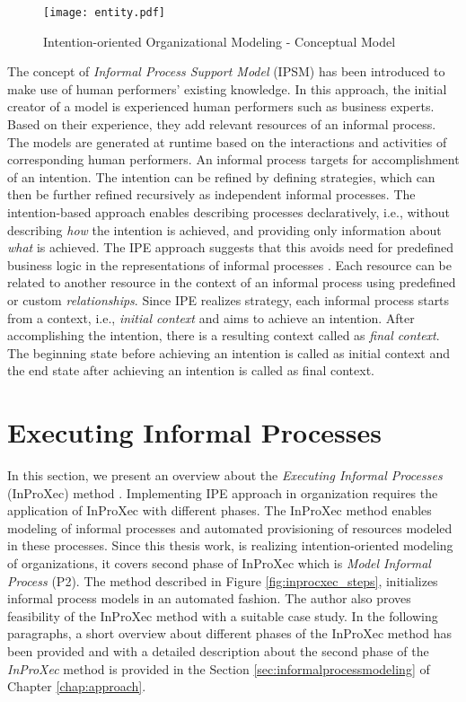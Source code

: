 \begin{figure}
	\centering
	\texttt{[image: entity.pdf]}
	\caption{Intention-oriented Organizational Modeling - Conceptual Model}
	\label{fig:entitymodel}
\end{figure}

The concept of \textit{Informal Process Support Model} (IPSM) \cite{Sungur2014a} has been introduced to make use of human performers' existing knowledge. In this approach, the initial creator of a model is experienced human performers such as business experts. Based on their experience, they add relevant resources of an informal process. The models are generated at runtime based on the interactions and activities of corresponding human performers. An informal process targets for accomplishment of an intention. The intention can be refined by defining strategies, which can then be further refined recursively as independent informal processes. The intention-based approach enables describing processes declaratively, i.e., without describing \textit{how} the intention is achieved, and providing only information about \textit{what} is achieved. The IPE approach suggests that this avoids need for predefined business logic in the representations of informal processes \cite{Sungur2014a}. Each resource can be related to another resource in the context of an informal process using predefined or custom \textit{relationships}. Since IPE realizes strategy, each informal process starts from a context, i.e., \textit{initial context} and aims to achieve an intention. After accomplishing the intention, there is a resulting context called as \textit{final context}. The beginning state before achieving an intention is called as initial context and the end state after achieving an intention is called as final context.

\section{Executing Informal Processes}
\label{sec:inproxec}
In this section, we present an overview about the \textit{Executing Informal Processes} (InProXec) method \cite{Sungur2015}. Implementing IPE approach in organization requires the application of InProXec with different phases. The InProXec method enables modeling of informal processes and automated provisioning of resources modeled in these processes. Since this thesis work, is realizing intention-oriented modeling of organizations, it covers second phase of InProXec which is \textit{Model Informal Process} (P2). The method described in Figure \ref{fig:inprocxec_steps}, initializes informal process models in an automated fashion. The author also proves feasibility of the InProXec method with a suitable case study. In the following paragraphs, a short overview about different phases of the InProXec method has been provided and with a detailed description about the second phase of the \textit{InProXec} method is provided in the Section \ref{sec:informalprocessmodeling} of Chapter \ref{chap:approach}. 

